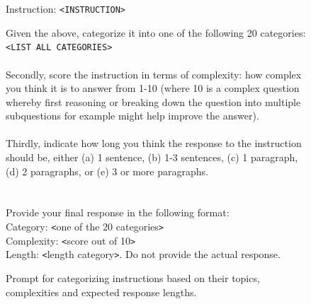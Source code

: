 \documentclass{article}
\begin{document}
\begin{figure}[th!]
\centering
\small
\begin{tcolorbox}[colback=green!10!white, %
                  colframe=green!30!white, %
                  width=0.99\textwidth, %
                  arc=4mm, %
                  auto outer arc,
                  ]
Instruction: \texttt{\color{red}<INSTRUCTION>}

Given the above, categorize it into one of the following 20 categories:\\
\texttt{\color{red}<LIST ALL CATEGORIES>}\\
\\
Secondly, score the instruction in terms of complexity: how complex you think it is to answer from 1-10 (where 10 is a complex question whereby first reasoning or breaking down the question into multiple subquestions for example might help improve the answer).\\
\\
Thirdly, indicate how long you think the response to the instruction should be, either (a) 1 sentence, (b) 1-3 sentences, (c) 1 paragraph, (d) 2 paragraphs, or (e) 3 or more paragraphs.\\
\\
\\
Provide your final response in the following format:\\
Category: \texttt{<}one of the 20 categories\texttt{>}\\
Complexity: \texttt{<}score out of 10\texttt{>}\\
Length: \texttt{<}length category\texttt{>}. Do not provide the actual response. 
\end{tcolorbox}
\caption{Prompt for categorizing instructions based on their topics, complexities and expected response lengths.}
\label{tab:instruction_category_complexity_expected_length_prompt}
\end{figure}
\end{document}

